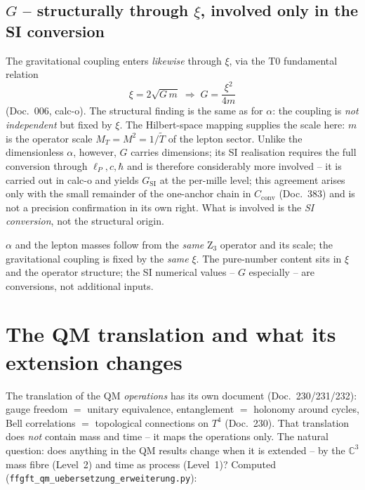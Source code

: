 \subsection{$G$ -- structurally through $\xi$, involved only in the SI conversion}

The gravitational coupling enters \emph{likewise} through $\xi$, via the T0
fundamental relation
\begin{equation}
  \xi=2\sqrt{G\,m}\;\Longrightarrow\; G=\frac{\xi^2}{4m}
\end{equation}
(Doc.~006, calc-o). The structural finding is the same as for $\alpha$: the
coupling is \emph{not independent} but fixed by $\xi$. The Hilbert-space mapping
supplies the scale here: $m$ is the operator scale $M_T=M^2=1/\tilde T$ of the
lepton sector. Unlike the dimensionless $\alpha$, however, $G$ carries
dimensions; its SI realisation requires the full conversion through
$\ell_P,c,\hbar$ and is therefore considerably more involved -- it is carried out
in calc-o and yields $G_{\text{SI}}$ at the per-mille level; this agreement arises only with the small remainder of the one-anchor chain in $C_{\text{conv}}$ (Doc.~383) and is not a precision confirmation in its own right. What is involved is
the \emph{SI conversion}, not the structural origin.

\begin{keyresult}
$\alpha$ and the lepton masses follow from the \emph{same} Z$_3$ operator and its
scale; the gravitational coupling is fixed by the \emph{same} $\xi$. The
pure-number content sits in $\xi$ and the operator structure; the SI numerical
values -- $G$ especially -- are conversions, not additional inputs.
\end{keyresult}

\section{The QM translation and what its extension changes}

The translation of the QM \emph{operations} has its own document
(Doc.~230/231/232): gauge freedom $=$ unitary equivalence, entanglement $=$
holonomy around cycles, Bell correlations $=$ topological connections on $T^4$
(Doc.~230). That translation does \emph{not} contain mass and time -- it maps the
operations only. The natural question: does anything in the QM results change when
it is extended -- by the $\mathbb{C}^3$ mass fibre (Level~2) and time as process
(Level~1)? Computed (\texttt{ffgft\_qm\_uebersetzung\_erweiterung.py}):

